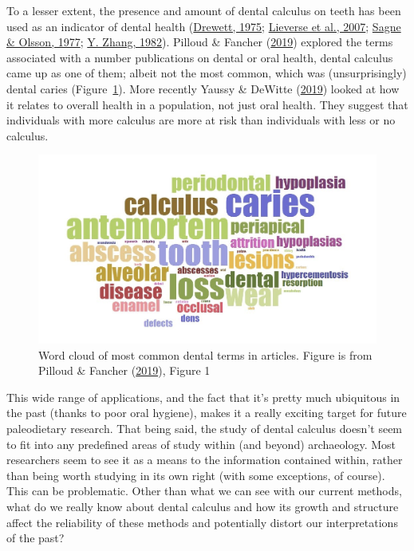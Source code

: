\documentclass[
  letterpaper,
]{book}
\begin{document}
To a lesser extent, the presence and amount of dental calculus on teeth
has been used as an indicator of dental health
(\protect\hyperlink{ref-drewettExcavationOval1975}{Drewett, 1975};
\protect\hyperlink{ref-lieverseDentalHealth2007}{Lieverse et al., 2007};
\protect\hyperlink{ref-sagneStudiesPeriodontal1977}{Sagne \& Olsson,
1977}; \protect\hyperlink{ref-zhangDentalDisease1982}{Y. Zhang, 1982}).
Pilloud \& Fancher
(\protect\hyperlink{ref-pilloudOutliningDefinition2019}{2019}) explored
the terms associated with a number publications on dental or oral
health, dental calculus came up as one of them; albeit not the most
common, which was (unsurprisingly) dental caries
(Figure~\ref{fig-dental-terms}). More recently Yaussy \& DeWitte
(\protect\hyperlink{ref-yaussyCalculusSurvivorship2019}{2019}) looked at
how it relates to overall health in a population, not just oral health.
They suggest that individuals with more calculus are more at risk than
individuals with less or no calculus.

\begin{figure}

{\centering \includegraphics{figures/wordcloud.png}

}

\caption{\label{fig-dental-terms}Word cloud of most common dental terms
in articles. Figure is from Pilloud \& Fancher
(\protect\hyperlink{ref-pilloudOutliningDefinition2019}{2019}), Figure
1}

\end{figure}

This wide range of applications, and the fact that it's pretty much
ubiquitous in the past (thanks to poor oral hygiene), makes it a really
exciting target for future paleodietary research. That being said, the
study of dental calculus doesn't seem to fit into any predefined areas
of study within (and beyond) archaeology. Most researchers seem to see
it as a means to the information contained within, rather than being
worth studying in its own right (with some exceptions, of course). This
can be problematic. Other than what we can see with our current methods,
what do we really know about dental calculus and how its growth and
structure affect the reliability of these methods and potentially
distort our interpretations of the past?
\end{document}
